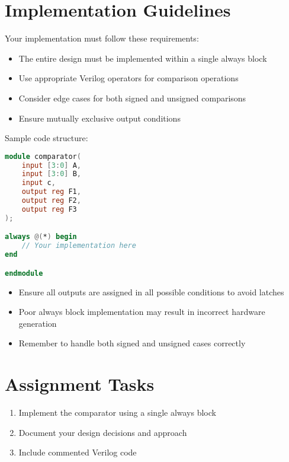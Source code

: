 \documentclass[12pt]{betterjournal}
\begin{document}
\section{Implementation Guidelines}

\begin{extra}[frametitle={Design Approach}]
Your implementation must follow these requirements:
\begin{itemize}
    \item The entire design must be implemented within a single always block
    \item Use appropriate Verilog operators for comparison operations
    \item Consider edge cases for both signed and unsigned comparisons
    \item Ensure mutually exclusive output conditions
\end{itemize}
\end{extra}

Sample code structure:
\begin{lstlisting}[language=Verilog]
module comparator(
    input [3:0] A,
    input [3:0] B,
    input c,
    output reg F1,
    output reg F2,
    output reg F3
);

always @(*) begin
    // Your implementation here
end

endmodule
\end{lstlisting}

\begin{important}[frametitle={Common Pitfalls}]
\begin{itemize}
    \item Ensure all outputs are assigned in all possible conditions to avoid latches
    \item Poor always block implementation may result in incorrect hardware generation
    \item Remember to handle both signed and unsigned cases correctly
\end{itemize}
\end{important}

\section{Assignment Tasks}

\begin{question}
\begin{enumerate}
    \item Implement the comparator using a single always block
    \item Document your design decisions and approach
    \item Include commented Verilog code
\end{enumerate}
\end{question}
\end{document}
